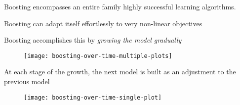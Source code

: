 \begin{frame}
  Boosting encompasses an entire family highly successful learning algorithms.
\end{frame}
%
\begin{frame}
Boosting can adapt itself effortlessly to very non-linear objectives
\end{frame}
%
\begin{frame}
Boosting accomplishes this by \textit{growing the model gradually}
  \begin{figure}
    \texttt{[image: boosting-over-time-multiple-plots]}
  \end{figure}
\end{frame}
%
\begin{frame}
At each stage of the growth, the next model is built as an adjustment to the previous model
  \begin{figure}
    \texttt{[image: boosting-over-time-single-plot]}
  \end{figure}
\end{frame}
%
